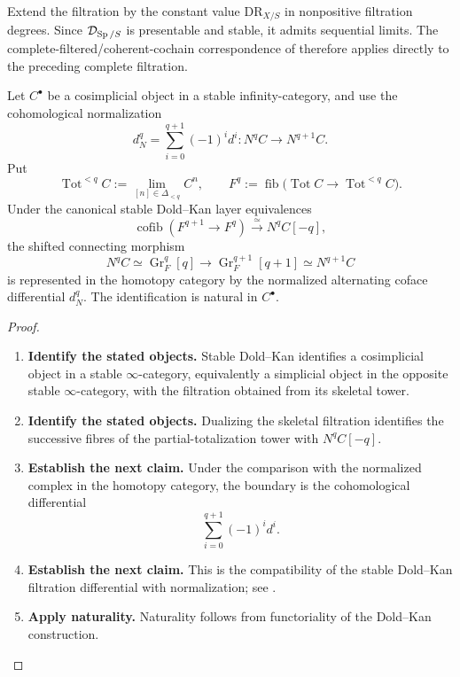 Extend the filtration by the constant value \(\mathrm{DR}_{X/S}\) in
nonpositive filtration degrees. Since \(\mathcal D_{\operatorname{Sp}/S}\) is presentable and
stable, it admits sequential limits. The complete-filtered/coherent-cochain
correspondence of \cite[Theorem~4.7 and Remark~4.9]{AriottaCoherentCochains}
therefore applies directly to the preceding complete filtration.

\begin{lemma}
\label{lem:totalization-normalization-sign}
Let \(C^\bullet\) be a cosimplicial object in a stable infinity-category, and use
the cohomological normalization
\[
  d_N^q
  =
  \sum_{i=0}^{q+1}(-1)^id^i
  :
  N^qC\longrightarrow N^{q+1}C.
\]
Put
\[
  \operatorname{Tot}^{<q}C
  :=
  \operatorname*{lim}_{[n]\in\Delta_{<q}}C^n,
  \qquad
  F^q
  :=
  \operatorname{fib}
  \bigl(
    \operatorname{Tot}C
    \longrightarrow
    \operatorname{Tot}^{<q}C
  \bigr).
\]
Under the canonical stable Dold--Kan layer equivalences
\[
  \operatorname{cofib}(F^{q+1}\to F^q)
  \xrightarrow{\simeq}
  N^qC[-q],
\]
the shifted connecting morphism
\[
  N^qC
  \simeq
  \operatorname{Gr}^q_F[q]
  \longrightarrow
  \operatorname{Gr}^{q+1}_F[q+1]
  \simeq
  N^{q+1}C
\]
is represented in the homotopy category by the normalized alternating coface
differential \(d_N^q\). The identification is natural in \(C^\bullet\).
\end{lemma}

\begin{proof}
\leavevmode
\begin{enumerate}[label=\textup{(\arabic*)}]
    \item \textbf{Identify the stated objects.}
    Stable Dold--Kan identifies a cosimplicial object in a stable
    \(\infty\)-category, equivalently a simplicial object in the opposite stable
    \(\infty\)-category, with the filtration obtained from its skeletal tower.
    \item \textbf{Identify the stated objects.}
    Dualizing the skeletal filtration identifies the successive fibres of the
    partial-totalization tower with \(N^qC[-q]\).
    \item \textbf{Establish the next claim.}
    Under the comparison with the normalized complex in the homotopy category, the
    boundary is the cohomological differential
    \[
    \sum_{i=0}^{q+1}(-1)^id^i.
    \]
    \item \textbf{Establish the next claim.}
    This is the compatibility of the stable Dold--Kan filtration differential with
    normalization; see \cite[Section~1.2.4]{LurieHigherAlgebra}.
    \item \textbf{Apply naturality.}
    Naturality follows
    from functoriality of the Dold--Kan construction.
\end{enumerate}
\end{proof}

